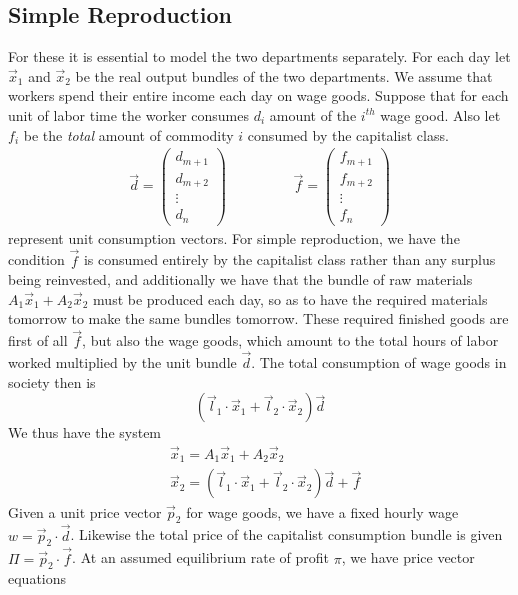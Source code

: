 \documentclass{article}
\theoremstyle{definition}
\theoremstyle{plain}
\theoremstyle{theorem}
\begin{document}
\subsection{Simple Reproduction}
For these it is essential to model the two departments separately. For each day let $\vec{x}_1$ and $\vec{x}_2$ be the real output bundles of the two departments. We assume that workers spend their entire income each day on wage goods. Suppose that for each unit of labor time the worker consumes $d_i$ amount of the $i^{th}$ wage good. Also let $f_i$ be the \emph{total} amount of commodity $i$ consumed by the capitalist class. 
\begin{align}
	\vec{d} = \begin{pmatrix} d_{m+1} \\ d_{m+2} \\ \vdots \\ d_n \end{pmatrix} \hspace{2cm} \vec{f} = \begin{pmatrix} f_{m+1} \\ f_{m+2} \\ \vdots \\ f_n \end{pmatrix}
\end{align}
represent unit consumption vectors. For simple reproduction, we have the condition $\vec{f}$ is consumed entirely by the capitalist class rather than any surplus being reinvested, and additionally we have that the bundle of raw materials $A_1\vec{x}_1 + A_2\vec{x}_2$ must be produced each day, so as to have the required materials tomorrow to make the same bundles tomorrow. These required finished goods are first of all $\vec{f}$, but also the wage goods, which amount to the total hours of labor worked multiplied by the unit bundle $\vec{d}$. The total consumption of wage goods in society then is 
\[ (\vec{l}_1\cdot \vec{x}_1 + \vec{l}_2 \cdot \vec{x}_2) \vec{d} \]
We thus have the system
\begin{align}
	& \vec{x}_1 = A_1 \vec{x}_1 + A_2 \vec{x}_2 \\
	& \vec{x}_2 = (\vec{l}_1\cdot \vec{x}_1 + \vec{l}_2 \cdot \vec{x}_2) \vec{d} + \vec{f} 
\end{align}
Given a unit price vector $\vec{p}_2$ for wage goods, we have a fixed hourly wage $w  =\vec{p}_2 \cdot \vec{d}$. Likewise the total price of the capitalist consumption bundle is given $\Pi = \vec{p}_2 \cdot \vec{f}$. At an assumed equilibrium rate of profit $\pi$, we have price vector equations
\end{document}
